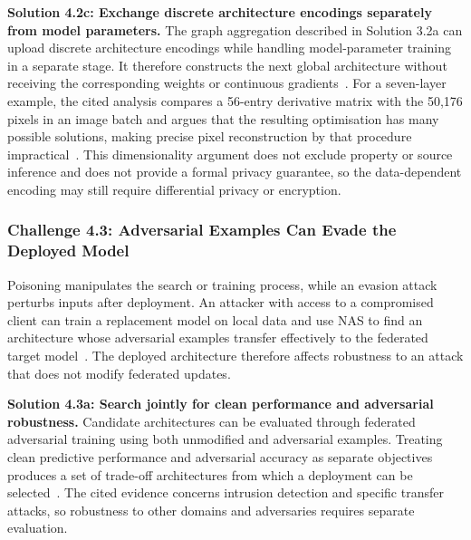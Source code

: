\noindent\textbf{Solution 4.2c: Exchange discrete architecture encodings separately from model parameters.} The graph aggregation described in Solution 3.2a can upload discrete architecture encodings while handling model-parameter training in a separate stage. It therefore constructs the next global architecture without receiving the corresponding weights or continuous gradients~\cite{multi-granular_fednas_2023}. For a seven-layer example, the cited analysis compares a 56-entry derivative matrix with the 50,176 pixels in an image batch and argues that the resulting optimisation has many possible solutions, making precise pixel reconstruction by that procedure impractical~\cite{multi-granular_fednas_2023}. This dimensionality argument does not exclude property or source inference and does not provide a formal privacy guarantee, so the data-dependent encoding may still require differential privacy or encryption.

\subsubsection{Challenge 4.3: Adversarial Examples Can Evade the Deployed Model}

Poisoning manipulates the search or training process, while an evasion attack perturbs inputs after deployment. An attacker with access to a compromised client can train a replacement model on local data and use NAS to find an architecture whose adversarial examples transfer effectively to the federated target model~\cite{fednas_based_attack_2024}. The deployed architecture therefore affects robustness to an attack that does not modify federated updates.

\noindent\textbf{Solution 4.3a: Search jointly for clean performance and adversarial robustness.} Candidate architectures can be evaluated through federated adversarial training using both unmodified and adversarial examples. Treating clean predictive performance and adversarial accuracy as separate objectives produces a set of trade-off architectures from which a deployment can be selected~\cite{fednas_based_attack_2024}. The cited evidence concerns intrusion detection and specific transfer attacks, so robustness to other domains and adversaries requires separate evaluation.
